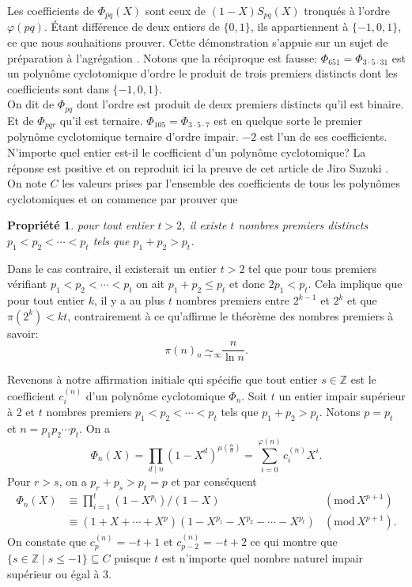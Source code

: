 \documentclass{article}
\theoremstyle{break}                  %
\newtheorem{propriete}{Propriété}
\begin{document}
Les coefficients de $\Phi_{pq}(X)$ sont ceux de $(1-X) S_{pq}(X)$ tronqués à l'ordre $\varphi(pq)$. Étant différence de deux entiers de $\{0,1\}$, ils appartiennent à $\{-1,0,1\}$, ce que nous souhaitions prouver. Cette démonstration s'appuie sur un sujet de préparation à l'agrégation \cite{agreg}.  Notons que la réciproque est fausse: $\Phi_{651} = \Phi_{3 \cdot 5 \cdot 31}$ est un polynôme cyclotomique d'ordre le produit de trois premiers distincts dont les coefficients sont dans $\{-1,0,1\}$.\\

On dit de $\Phi_{pq}$ dont l'ordre est produit de deux premiers distincts qu'il est binaire. Et de $\Phi_{pqr}$ qu'il est ternaire. $\Phi_{105} = \Phi_{3 \cdot 5 \cdot 7}$ est en quelque sorte le premier polynôme cyclotomique ternaire d'ordre impair. $-2$ est l'un de ses coefficients. N'importe quel entier est-il le coefficient d'un polynôme cyclotomique? La réponse est positive et on reproduit ici la preuve de cet article de Jiro Suzuki \cite{range}.\\

On note $C$ les valeurs prises par l'ensemble des coefficients de tous les polynômes cyclotomiques et on commence par prouver que
\begin{propriete}
	pour tout entier $t > 2$, il existe $t$ nombres premiers distincts $p_1 < p_2 < \cdots < p_t$ tels que $p_1+p_2 > p_t$.
\end{propriete}
Dans le cas contraire, il existerait un entier $t > 2$ tel que pour tous premiers vérifiant $p_1 < p_2 < \cdots < p_t$ on ait $p_1+p_2 \le p_t$ et donc $2 p_1 < p_t$. Cela implique que pour tout entier $k$, il y a au plus $t$ nombres premiers entre $2^{k-1}$ et $2^k$ et que $\pi(2^k) < kt$, contrairement à ce qu'affirme le théorème des nombres premiers à savoir: 
$$\pi(n) \underset{n \to \infty}{\sim} \frac{n}{\ln n}.$$

Revenons à notre affirmation initiale qui spécifie que tout entier $s \in \mathbb Z$ est le coefficient $c_i^{(n)}$ d'un polynôme cyclotomique $\Phi_n$. Soit $t$ un entier impair supérieur à 2 et $t$ nombres premiers $p_1 < p_2 < \cdots < p_t$ tels que $p_1+p_2 > p_t$. Notons $p = p_t$ et $n = p_1 p_2 \cdots p_t$. On a
$$\Phi_n(X) = \prod_{d \mid n} (1-X^d)^{\mu(\frac{n}{d})} = \sum_{i = 0}^{\varphi(n)} c_i^{(n)} X^i.$$
Pour $r > s$, on a $p_r + p_s > p_t = p$ et par conséquent
\begin{align*}
	\Phi_n(X) &\equiv \prod_{i=1}^{t} (1-X^{p_i})/(1-X) &(\mathrm{mod} \, X^{p+1})\\
	&\equiv (1 + X + \cdots + X^p)(1 - X^{p_1}-X^{p_2}-\cdots-X^{p_t})  &(\mathrm{mod} \, X^{p+1}).
\end{align*}
On constate que $c_p^{(n)}=-t+1$ et $c_{p-2}^{(n)}=-t+2$ ce qui montre que $\{s \in \mathbb Z \mid s \le -1\} \subseteq C$ puisque $t$ est n'importe quel nombre naturel impair supérieur ou égal à $3$.\\
\end{document}
